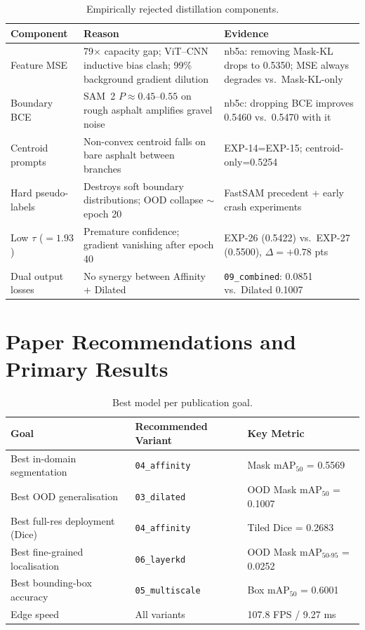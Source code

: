 \documentclass[12pt,a4paper]{article}
\begin{document}
\begin{table}[H]\centering
\caption{Empirically rejected distillation components.}
\label{tab:rejected}
\begin{tabular}{p{2.8cm}p{5.8cm}p{4.8cm}}
\toprule
Component & Reason & Evidence \\
\midrule
Feature MSE &
  79$\times$ capacity gap; ViT--CNN inductive bias clash;
  99\% background gradient dilution &
  nb5a: removing Mask-KL drops to 0.5350;
  MSE always degrades vs.\ Mask-KL-only \\
\midrule
Boundary BCE &
  SAM~2 $P\approx0.45$--$0.55$ on rough asphalt amplifies gravel noise &
  nb5c: dropping BCE improves 0.5460 vs.\ 0.5470 with it \\
\midrule
Centroid prompts &
  Non-convex centroid falls on bare asphalt between branches &
  EXP-14=EXP-15; centroid-only=0.5254 \\
\midrule
Hard pseudo-labels &
  Destroys soft boundary distributions; OOD collapse $\sim$epoch 20 &
  FastSAM precedent + early crash experiments \\
\midrule
Low $\tau$ ($=1.93$) &
  Premature confidence; gradient vanishing after epoch 40 &
  EXP-26 (0.5422) vs.\ EXP-27 (0.5500), $\Delta=+0.78$ pts \\
\midrule
Dual output losses &
  No synergy between Affinity + Dilated &
  \texttt{09\_combined}: 0.0851 vs.\ Dilated 0.1007 \\
\bottomrule
\end{tabular}
\end{table}

\section{Paper Recommendations and Primary Results}
\label{sec:paper}

\begin{table}[H]\centering
\caption{Best model per publication goal.}
\begin{tabular}{lll}
\toprule
Goal & Recommended Variant & Key Metric \\
\midrule
Best in-domain segmentation & \texttt{04\_affinity} & Mask mAP$_{50}$ = 0.5569 \\
Best OOD generalisation & \texttt{03\_dilated} & OOD Mask mAP$_{50}$ = 0.1007 \\
Best full-res deployment (Dice) & \texttt{04\_affinity} & Tiled Dice = 0.2683 \\
Best fine-grained localisation & \texttt{06\_layerkd} & OOD Mask mAP$_{50\text{-}95}$ = 0.0252 \\
Best bounding-box accuracy & \texttt{05\_multiscale} & Box mAP$_{50}$ = 0.6001 \\
Edge speed & All variants & 107.8 FPS / 9.27 ms \\
\bottomrule
\end{tabular}
\end{table}
\end{document}
